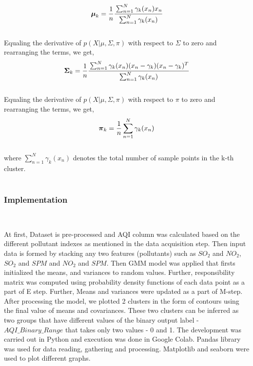 \documentclass{article}
\begin{document}
\begin{itemize}
\begin{align}
\boldsymbol{\mu}_k = {1 \over {n}}\cfrac{\sum_{n=1}^N \gamma_{k}(x_n) x_{n}}{\sum_{n=1}^N \gamma_{k}(x_n)} 
\end{align}
\\

Equaling the derivative of  $p(X|\mu, \Sigma, \pi)$ with respect to $\Sigma$ to zero and rearranging the terms, we get, \\

\begin{align}
\boldsymbol{\Sigma}_k = {1 \over {n}}\cfrac{\sum_{n=1}^N \gamma_{k}(x_n) (x_{n} - \gamma_{k})(x_{n} - \gamma_{k})^T}{\sum_{n=1}^N \gamma_{k}(x_n)} 
\end{align}
\\

Equaling the derivative of  $p(X|\mu, \Sigma, \pi)$ with respect to $\pi$ to zero and rearranging the terms, we get, \\

\begin{align}
\boldsymbol{\pi}_k = {1 \over {n}} \sum_{n=1}^N \gamma_{k}(x_n)
\end{align}
\\

 where $\sum_{n=1}^N \gamma_{k}(x_n)$ denotes the total number of sample points in the k-th cluster. \\ \\
\end{itemize}

\subsubsection {\color{brown}
\textbf{Implementation}} \\ 
\begin{itemize}

At first, Dataset is pre-processed and AQI column was calculated based on the different pollutant indexes as mentioned in the data acquisition step. Then input data is formed by stacking any two features (pollutants) such as $SO_2$ and $NO_2$, $SO_2$ and $SPM$ and $NO_2$ and $SPM$. 
Then GMM model was applied that firsts initialized the means, and variances to random values. Further, responsibility matrix was computed using probability density functions of each data point as a part of E step. Further, Means and variances were updated as a part of M-step. After processing the model, we plotted 2 clusters in the form of contours using the final value of means and covariances. These two clusters can be inferred as two groups that have different values of the binary output label - $AQI\_Binary\_Range$ that takes only two values - 0 and 1. The development was carried out in Python and execution was done in Google Colab. Pandas library was used for data reading, gathering and processing. Matplotlib and seaborn were used to plot different graphs.  
\end{itemize}
\newpage
\end{document}
